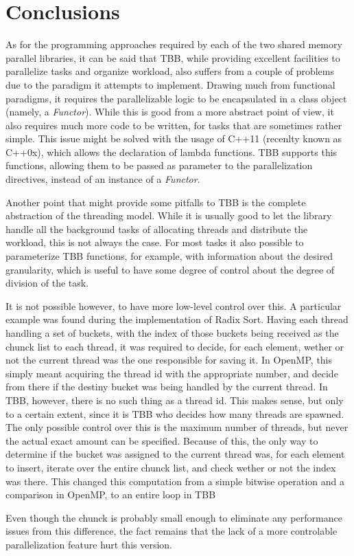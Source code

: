 \section{Conclusions}
\label{sec:900}

As for the programming approaches required by each of the two shared memory parallel libraries, it can be said that TBB, while providing excellent facilities to parallelize tasks and organize workload, also suffers from a couple of problems due to the paradigm it attempts to implement. Drawing much from functional paradigms, it requires the parallelizable logic to be encapsulated in a class object (namely, a \textit{Functor}). While this is good from a more abstract point of view, it also requires much more code to be written, for tasks that are sometimes rather simple. This issue might be solved with the usage of C++11 (recenlty known as C++0x), which allows the declaration of lambda functions. TBB supports this functions, allowing them to be passed as parameter to the parallelization directives, instead of an instance of a \textit{Functor}.

Another point that might provide some pitfalls to TBB is the complete abstraction of the threading model. While it is usually good to let the library handle all the background tasks of allocating threads and distribute the workload, this is not always the case. For most tasks it also possible to parameterize TBB functions, for example, with information about the desired granularity, which is useful to have some degree of control about the degree of division of the task.

It is not possible however, to have more low-level control over this. A particular example was found during the implementation of Radix Sort. Having each thread handling a set of buckets, with the index of those buckets being received as the chunck list to each thread, it was required to decide, for each element, wether or not the current thread was the one responsible for saving it. In OpenMP, this simply meant acquiring the thread id with the appropriate number, and decide from there if the destiny bucket was being handled by the current thread.
In TBB, however, there is no such thing as a thread id. This makes sense, but only to a certain extent, since it is TBB who decides how many threads are spawned. The only possible control over this is the maximum number of threads, but never the actual exact amount can be specified.
Because of this, the only way to determine if the bucket was assigned to the current thread was, for each element to insert, iterate over the entire chunck list, and check wether or not the index was there. This changed this computation from a simple bitwise operation and a comparison in OpenMP, to an entire loop in TBB

Even though the chunck is probably small enough to eliminate any performance issues from this difference, the fact remains that the lack of a more controlable parallelization feature hurt this version.
